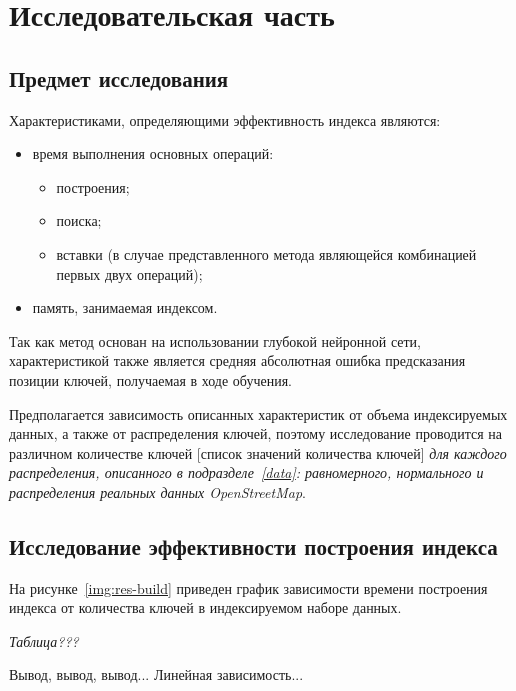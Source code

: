 \chapter{\label{research}Исследовательская часть}

\section{Предмет исследования}

Характеристиками, определяющими эффективность индекса являются:

\begin{itemize}
    \item время выполнения основных операций:
\begin{itemize}
    \item построения;
    \item поиска;
    \item вставки (в случае представленного метода являющейся
        комбинацией первых двух операций);
\end{itemize}
    \item память, занимаемая индексом.
\end{itemize}

Так как метод основан на использовании глубокой нейронной сети,
характеристикой также является средняя абсолютная ошибка предсказания позиции
ключей, получаемая в ходе обучения.

Предполагается зависимость описанных характеристик от объема индексируемых
данных, а также от распределения ключей, поэтому исследование проводится на
различном количестве ключей [список значений количества ключей] \textit{для
каждого распределения, описанного в подразделе~\ref{data}: равномерного,
нормального и распределения реальных данных OpenStreetMap}.

\section{Исследование эффективности построения индекса}

На рисунке~\ref{img:res-build} приведен график зависимости времени построения
индекса от количества ключей в индексируемом наборе данных.

\textit{Таблица???}


Вывод, вывод, вывод... Линейная зависимость...

